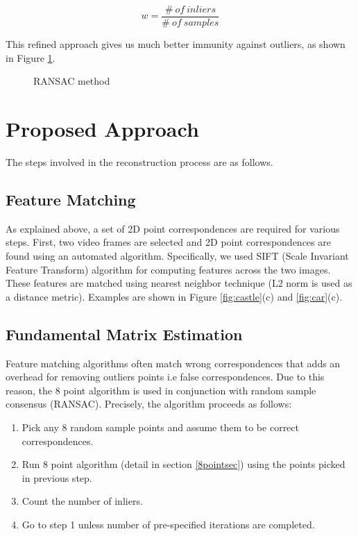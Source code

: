 \documentclass[11pt, a4paper, openany]{article}
\begin{document}
\begin{equation}\label{prob-inlier}
w = \frac{\# \ of \ inliers}{\# \ of \ samples}
\end{equation}

This refined approach gives us much better immunity against outliers, as shown in Figure \ref{fig:ransac}.

\begin{figure}%
    \centering
    \qquad
    \caption{RANSAC method}%
    \label{fig:ransac}%
\end{figure}

\section{Proposed Approach}

The steps involved in the reconstruction process are as follows.

\subsection{Feature Matching} As explained above, a set of 2D point correspondences are required for various steps. First, two video frames are selected and 2D point correspondences are found using an automated algorithm. Specifically, we used SIFT (Scale Invariant Feature Transform) \cite{SIFT} algorithm for computing features across the two images. These features are matched using nearest neighbor technique (L2 norm is used as a distance metric). Examples are shown in Figure \ref{fig:castle}(c) and \ref{fig:car}(c).

\subsection{Fundamental Matrix Estimation} Feature matching algorithms often match wrong correspondences that adds an overhead for removing outliers points i.e false correspondences. Due to this reason, the 8 point algorithm is used in conjunction with random sample consensus (RANSAC). Precisely, the algorithm proceeds as follows:

\begin{enumerate}
\item Pick any 8 random sample points and assume them to be correct correspondences.
\item Run 8 point algorithm (detail in section \ref{8pointsec}) using the points picked in previous step.
\item Count the number of inliers.
\item Go to step 1 unless number of pre-specified iterations are completed.
\end{enumerate}
\end{document}
